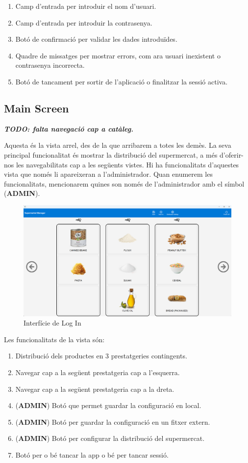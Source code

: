 \documentclass[a4paper,12pt]{article}
\begin{document}
	\begin{enumerate}[itemsep=0pt, topsep=0pt]
		\item Camp d'entrada per introduir el nom d'usuari.
		\item Camp d'entrada per introduir la contrasenya.
		\item Botó de confirmació per validar les dades introduïdes.
		\item Quadre de missatges per mostrar errors, com ara usuari inexistent o contrasenya incorrecta.
		\item Botó de tancament per sortir de l'aplicació o finalitzar la sessió activa.
	\end{enumerate}
	
	\newpage
	\subsection{Main Screen}
	
	\textbf{\textit{TODO: falta navegació cap a catàleg.}}
	
	Aquesta és la vista arrel, des de la que arribarem a totes les demès. La seva principal funcionalitat és mostrar la distribució del supermercat, a més d'oferir-nos les navegabilitats cap a les següents vistes. Hi ha funcionalitats d'aquestes vista que només li apareixeran a l'administrador. Quan enumerem les funcionalitats, mencionarem quines son només de l'administrador amb el símbol (\textbf{ADMIN}).
	
	\begin{figure}[H] 
		\centering
		\includegraphics[width=0.75\linewidth]{assets/mainscreen.png}
		\caption{Interfície de Log In}
	\end{figure}
	
	\noindent Les funcionalitats de la vista són:
	
	\begin{enumerate}[itemsep=0pt, topsep=0pt]
		\item Distribució dels productes en 3 prestatgeries contingents.
		\item Navegar cap a la següent prestatgeria cap a l'esquerra.
		\item Navegar cap a la següent prestatgeria cap a la dreta.
		\item (\textbf{ADMIN}) Botó que permet guardar la configuració en local.
		\item (\textbf{ADMIN}) Botó per guardar la configuració en un fitxer extern.
		\item (\textbf{ADMIN}) Botó per configurar la distribució del supermercat.
		\item Botó per o bé tancar la app o bé per tancar sessió.
	\end{enumerate}
	
\end{document}
